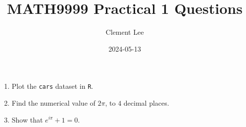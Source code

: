 \documentclass[a4paper]{article}
\title{MATH9999 Practical 1 Questions}
\author{Clement Lee}
\date{2024-05-13}
\begin{document}
\maketitle
\noindent

\begin{enumerate}
  \item Plot the \texttt{cars} dataset in \verb^R^. 
  \item Find the numerical value of $2\pi$, to $4$ decimal places.
  \item Show that $e^{i\pi}+1=0$.
\end{enumerate}

\end{document}
